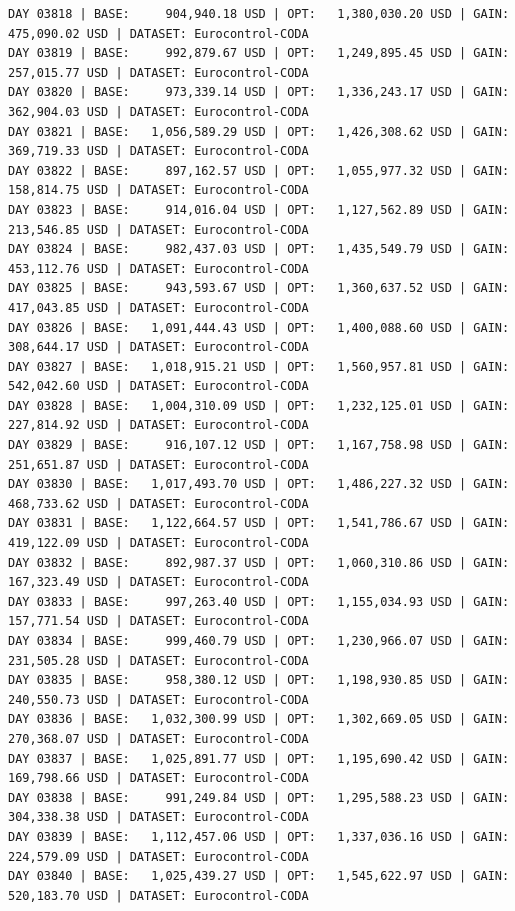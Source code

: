 \documentclass[11pt,a4paper]{article}
\begin{document}
\begin{verbatim}
DAY 03818 | BASE:     904,940.18 USD | OPT:   1,380,030.20 USD | GAIN: 475,090.02 USD | DATASET: Eurocontrol-CODA
DAY 03819 | BASE:     992,879.67 USD | OPT:   1,249,895.45 USD | GAIN: 257,015.77 USD | DATASET: Eurocontrol-CODA
DAY 03820 | BASE:     973,339.14 USD | OPT:   1,336,243.17 USD | GAIN: 362,904.03 USD | DATASET: Eurocontrol-CODA
DAY 03821 | BASE:   1,056,589.29 USD | OPT:   1,426,308.62 USD | GAIN: 369,719.33 USD | DATASET: Eurocontrol-CODA
DAY 03822 | BASE:     897,162.57 USD | OPT:   1,055,977.32 USD | GAIN: 158,814.75 USD | DATASET: Eurocontrol-CODA
DAY 03823 | BASE:     914,016.04 USD | OPT:   1,127,562.89 USD | GAIN: 213,546.85 USD | DATASET: Eurocontrol-CODA
DAY 03824 | BASE:     982,437.03 USD | OPT:   1,435,549.79 USD | GAIN: 453,112.76 USD | DATASET: Eurocontrol-CODA
DAY 03825 | BASE:     943,593.67 USD | OPT:   1,360,637.52 USD | GAIN: 417,043.85 USD | DATASET: Eurocontrol-CODA
DAY 03826 | BASE:   1,091,444.43 USD | OPT:   1,400,088.60 USD | GAIN: 308,644.17 USD | DATASET: Eurocontrol-CODA
DAY 03827 | BASE:   1,018,915.21 USD | OPT:   1,560,957.81 USD | GAIN: 542,042.60 USD | DATASET: Eurocontrol-CODA
DAY 03828 | BASE:   1,004,310.09 USD | OPT:   1,232,125.01 USD | GAIN: 227,814.92 USD | DATASET: Eurocontrol-CODA
DAY 03829 | BASE:     916,107.12 USD | OPT:   1,167,758.98 USD | GAIN: 251,651.87 USD | DATASET: Eurocontrol-CODA
DAY 03830 | BASE:   1,017,493.70 USD | OPT:   1,486,227.32 USD | GAIN: 468,733.62 USD | DATASET: Eurocontrol-CODA
DAY 03831 | BASE:   1,122,664.57 USD | OPT:   1,541,786.67 USD | GAIN: 419,122.09 USD | DATASET: Eurocontrol-CODA
DAY 03832 | BASE:     892,987.37 USD | OPT:   1,060,310.86 USD | GAIN: 167,323.49 USD | DATASET: Eurocontrol-CODA
DAY 03833 | BASE:     997,263.40 USD | OPT:   1,155,034.93 USD | GAIN: 157,771.54 USD | DATASET: Eurocontrol-CODA
DAY 03834 | BASE:     999,460.79 USD | OPT:   1,230,966.07 USD | GAIN: 231,505.28 USD | DATASET: Eurocontrol-CODA
DAY 03835 | BASE:     958,380.12 USD | OPT:   1,198,930.85 USD | GAIN: 240,550.73 USD | DATASET: Eurocontrol-CODA
DAY 03836 | BASE:   1,032,300.99 USD | OPT:   1,302,669.05 USD | GAIN: 270,368.07 USD | DATASET: Eurocontrol-CODA
DAY 03837 | BASE:   1,025,891.77 USD | OPT:   1,195,690.42 USD | GAIN: 169,798.66 USD | DATASET: Eurocontrol-CODA
DAY 03838 | BASE:     991,249.84 USD | OPT:   1,295,588.23 USD | GAIN: 304,338.38 USD | DATASET: Eurocontrol-CODA
DAY 03839 | BASE:   1,112,457.06 USD | OPT:   1,337,036.16 USD | GAIN: 224,579.09 USD | DATASET: Eurocontrol-CODA
DAY 03840 | BASE:   1,025,439.27 USD | OPT:   1,545,622.97 USD | GAIN: 520,183.70 USD | DATASET: Eurocontrol-CODA

\end{verbatim}
\end{document}
